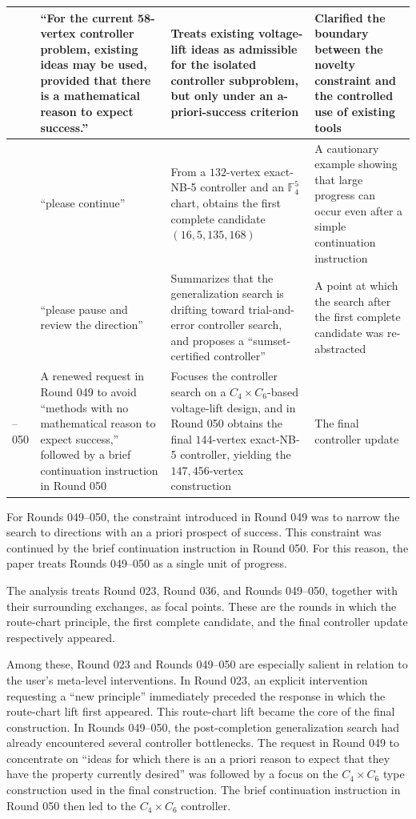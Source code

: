 \documentclass[11pt]{article}
\theoremstyle{definition}
\theoremstyle{remark}
\renewcommand{\_}{\textunderscore\allowbreak}
\begin{document}
{\begin{longtable}{>{\raggedright\arraybackslash}p{}>{\raggedright\arraybackslash}p{}>{\raggedright\arraybackslash}p{}>{\raggedright\arraybackslash}p{}}
\midrule
026 & ``For the current 58-vertex controller problem, existing ideas may be used, provided that there is a mathematical reason to expect success.'' & Treats existing voltage-lift ideas as admissible for the isolated controller subproblem, but only under an a-priori-success criterion & Clarified the boundary between the novelty constraint and the controlled use of existing tools \\
\midrule
036 & ``please continue'' & From a \(132\)-vertex exact-NB-5 controller and an \(\mathbb F_4^5\) chart, obtains the first complete candidate \((16,5,135{,}168)\) & A cautionary example showing that large progress can occur even after a simple continuation instruction \\
\midrule
047 & ``please pause and review the direction'' & Summarizes that the generalization search is drifting toward trial-and-error controller search, and proposes a ``sumset-certified controller'' & A point at which the search after the first complete candidate was re-abstracted \\
\midrule
049--050 & A renewed request in Round 049 to avoid ``methods with no mathematical reason to expect success,'' followed by a brief continuation instruction in Round 050 & Focuses the controller search on a \(C_4\times C_6\)-based voltage-lift design, and in Round 050 obtains the final \(144\)-vertex exact-NB-5 controller, yielding the \(147{,}456\)-vertex construction & The final controller update \\
\end{longtable}
}

For Rounds 049--050, the constraint introduced in Round 049 was to
narrow the search to directions with an a priori prospect of success.
This constraint was continued by the brief continuation instruction in
Round 050. For this reason, the paper treats Rounds 049--050 as a single
unit of progress.

The analysis treats Round 023, Round 036, and Rounds
049--050, together with their surrounding exchanges, as focal points.
These are the rounds in which the route-chart principle, the first
complete candidate, and the final controller update respectively
appeared.

Among these, Round 023 and Rounds 049--050 are especially salient in
relation to the user's meta-level interventions. In Round 023, an
explicit intervention requesting a ``new principle'' immediately
preceded the response in which the route-chart lift first appeared. This
route-chart lift became the core of the final construction. In Rounds
049--050, the post-completion generalization search had already
encountered several controller bottlenecks. The request in Round 049 to
concentrate on ``ideas for which there is an a priori reason to expect
that they have the property currently desired'' was followed by a focus
on the \(C_4\times C_6\) type construction used in the final
construction. The brief continuation instruction in Round 050 then led
to the \(C_4\times C_6\) controller.
\end{document}
